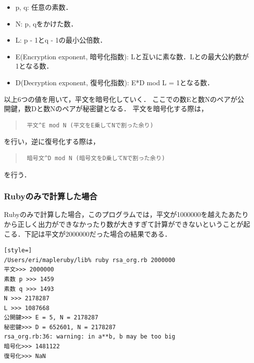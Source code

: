 \begin{itemize}
\item p, q: 任意の素数．
\item N: p, qをかけた数．
\item L: p - 1とq - 1の最小公倍数．
\item E(Encryption exponent, 暗号化指数): Lと互いに素な数．Lとの最大公約数が1となる数．
\item D(Decryption exponent, 復号化指数): E*D mod L = 1となる数．
\end{itemize}
以上6つの値を用いて，平文を暗号化していく．
ここでの数Eと数Nのペアが公開鍵，数Dと数Nのペアが秘密鍵となる．
平文を暗号化する際は，
\begin{quote}\begin{verbatim}
 平文^E mod N (平文をE乗してNで割った余り)
\end{verbatim}\end{quote}
を行い，逆に復号化する際は，
\begin{quote}\begin{verbatim}
 暗号文^D mod N (暗号文をD乗してNで割った余り)
\end{verbatim}\end{quote}
を行う．

\subsubsection{Rubyのみで計算した場合}
Rubyのみで計算した場合，このプログラムでは，平文が1000000を越えたあたりから正しく出力ができなかったり数が大きすぎて計算ができないということが起こる．下記は平文が2000000だった場合の結果である．
\begin{lstlisting}[style=]
/Users/eri/mapleruby/lib% ruby rsa_org.rb 2000000
平文>>> 2000000
素数 p >>> 1459
素数 q >>> 1493
N >>> 2178287
L >>> 1087668
公開鍵>>> E = 5, N = 2178287
秘密鍵>>> D = 652601, N = 2178287
rsa_org.rb:36: warning: in a**b, b may be too big
暗号化>>> 1481122
復号化>>> NaN
\end{lstlisting}
